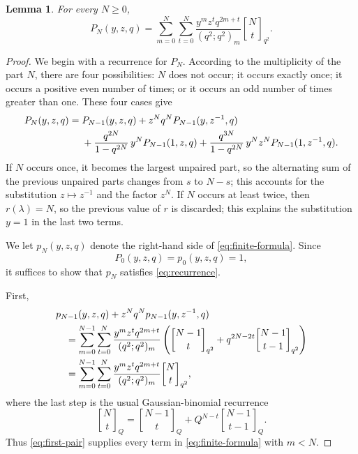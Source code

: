 \documentclass[11pt]{article}
\newtheorem{lemma}[theorem]{Lemma}
\theoremstyle{definition}
\theoremstyle{remark}
\newcommand{\qbinom}[3][]{%
  \genfrac{[}{]}{0pt}{}{#2}{#3}_{#1}%
}
\begin{document}
\begin{lemma}\label{lem:finite}
For every $N\ge0$,
\begin{equation}\label{eq:finite-formula}
 P_N(y,z,q)
 =\sum_{m=0}^{N}\sum_{t=0}^{N}
 \frac{y^m z^t q^{2m+t}}{(q^2;q^2)_m}
 \qbinom[q^2]{N}{t}.
\end{equation}
\end{lemma}

\begin{proof}
We begin with a recurrence for $P_N$.  According to the multiplicity of the part $N$, there are four possibilities: $N$ does not occur; it occurs exactly once; it occurs a positive even number of times; or it occurs an odd number of times greater than one.  These four cases give
\begin{align}
 P_N(y,z,q)
 ={}&P_{N-1}(y,z,q)
 +z^Nq^N P_{N-1}(y,z^{-1},q) \notag\\
 &+\frac{q^{2N}}{1-q^{2N}}\,y^N P_{N-1}(1,z,q)
 +\frac{q^{3N}}{1-q^{2N}}\,y^Nz^N P_{N-1}(1,z^{-1},q).
 \label{eq:recurrence}
\end{align}
If $N$ occurs once, it becomes the largest unpaired part, so the alternating sum of the previous unpaired parts changes from $s$ to $N-s$; this accounts for the substitution $z\mapsto z^{-1}$ and the factor $z^N$.  If $N$ occurs at least twice, then $r(\lambda)=N$, so the previous value of $r$ is discarded; this explains the substitution $y=1$ in the last two terms.

We let $p_N(y,z,q)$ denote the right-hand side of \eqref{eq:finite-formula}.  Since
\[
 P_0(y,z,q)=p_0(y,z,q)=1,
\]
it suffices to show that $p_N$ satisfies \eqref{eq:recurrence}.

First,
\begin{align}
 &p_{N-1}(y,z,q)+z^Nq^Np_{N-1}(y,z^{-1},q)\notag\\
 &\quad=
 \sum_{m=0}^{N-1}\sum_{t=0}^{N}
 \frac{y^mz^tq^{2m+t}}{(q^2;q^2)_m}
 \left(
 \qbinom[q^2]{N-1}{t}
 +q^{2N-2t}\qbinom[q^2]{N-1}{t-1}
 \right)\notag\\
 &\quad=
 \sum_{m=0}^{N-1}\sum_{t=0}^{N}
 \frac{y^mz^tq^{2m+t}}{(q^2;q^2)_m}
 \qbinom[q^2]{N}{t},
 \label{eq:first-pair}
\end{align}
where the last step is the usual Gaussian-binomial recurrence
\[
 \qbinom[Q]{N}{t}
 =\qbinom[Q]{N-1}{t}
 +Q^{N-t}\qbinom[Q]{N-1}{t-1}.
\]
Thus \eqref{eq:first-pair} supplies every term in \eqref{eq:finite-formula} with $m<N$.


\end{proof}
\end{document}
